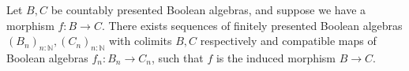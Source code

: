 \begin{lemma}\label{lemDecompositionOfColimitMorphisms}
  Let $B,C$ be countably presented Boolean algebras, 
  and suppose we have a morphism $f:B\to C$.
  There exists sequences of finitely presented Boolean algebras 
  $(B_n)_{n:\mathbb N}, (C_n)_{n:\mathbb N}$ with colimits $B,C$ respectively
  and compatible maps of Boolean algebras $f_n:B_n \to C_n$, 
  such that $f$ is the induced morphism $B\to C$.
\end{lemma}

